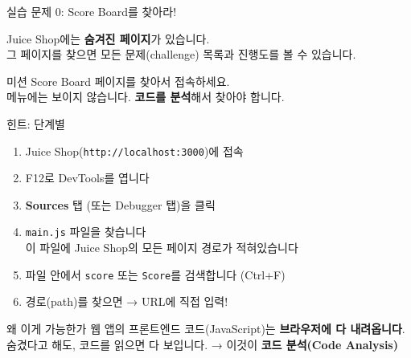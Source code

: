 \documentclass[aspectratio=169,10pt]{beamer}
\newcommand{\hlt}[1]{\textcolor{accent}{\textbf{#1}}}
\begin{document}
\begin{frame}{실습 문제 0: Score Board를 찾아라!}

Juice Shop에는 \hlt{숨겨진 페이지}가 있습니다.\\
그 페이지를 찾으면 모든 문제(challenge) 목록과 진행도를 볼 수 있습니다.

\vspace{0.5em}
\begin{block}{미션}
Score Board 페이지를 찾아서 접속하세요.\\
메뉴에는 보이지 않습니다. \hlt{코드를 분석}해서 찾아야 합니다.
\end{block}

\vspace{0.5em}
\begin{block}{힌트: 단계별}
\begin{enumerate}
    \item Juice Shop(\texttt{http://localhost:3000})에 접속
    \item F12로 DevTools를 엽니다
    \item \textbf{Sources} 탭 (또는 Debugger 탭)을 클릭
    \item \texttt{main.js} 파일을 찾습니다\\
          {\footnotesize 이 파일에 Juice Shop의 모든 페이지 경로가 적혀있습니다}
    \item 파일 안에서 \texttt{score} 또는 \texttt{Score}를 검색합니다 (Ctrl+F)
    \item 경로(path)를 찾으면 → URL에 직접 입력!
\end{enumerate}
\end{block}

\vspace{0.3em}
\begin{exampleblock}{왜 이게 가능한가}
웹 앱의 프론트엔드 코드(JavaScript)는 \hlt{브라우저에 다 내려옵니다}.\\
숨겼다고 해도, 코드를 읽으면 다 보입니다. → 이것이 \textbf{코드 분석(Code Analysis)}
\end{exampleblock}
\end{frame}
\end{document}
